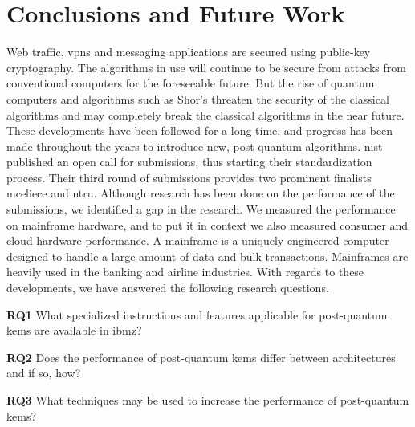 \chapter{Conclusions and Future Work}
\label{chapter:conclusion}

\noindent Web traffic, \glspl{vpn} and messaging applications are secured using public-key cryptography. The algorithms in use will continue to be secure from attacks from conventional computers for the foreseeable future.  But the rise of quantum computers and algorithms such as Shor's threaten the security of the classical algorithms and may completely break the classical algorithms in the near future. These developments have been followed for a long time, and progress has been made throughout the years to introduce new, post-quantum algorithms. \acrfull{nist} published an open call for submissions, thus starting their standardization process. Their third round of submissions provides two prominent finalists \gls{mceliece} and \gls{ntru}. Although research has been done on the performance of the submissions, we identified a gap in the research. We measured the performance on mainframe hardware, and to put it in context we also measured consumer and cloud hardware performance. A mainframe is a uniquely engineered computer designed to handle a large amount of data and bulk transactions. Mainframes are heavily used in the banking and airline industries. With regards to these developments, we have answered the following research questions.

\begin{description}
    \item \textbf{RQ1} What specialized instructions and features applicable for \gls{post-quantum} \acrlong{kem}s are available in \gls{ibmz}?
    
    \item \textbf{RQ2} Does the performance of \gls{post-quantum} \acrlong{kem}s differ between architectures and if so, how?
    
    \item \textbf{RQ3} What techniques may be used to increase the performance of \gls{post-quantum} \acrlong{kem}s?
\end{description}

